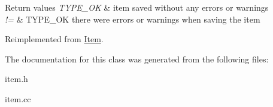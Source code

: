 \begin{DoxyRetVals}{Return values}
{\em T\+Y\+P\+E\+\_\+\+OK} & item saved without any errors or warnings \\
\hline
{\em !=} & T\+Y\+P\+E\+\_\+\+OK there were errors or warnings when saving the item \\
\hline
\end{DoxyRetVals}


Reimplemented from \mbox{\hyperlink{classItem_a463ded5f3c21ed2508dd8fddc6024722}{Item}}.



The documentation for this class was generated from the following files\+:\begin{DoxyCompactItemize}
\item 
item.\+h\item 
item.\+cc\end{DoxyCompactItemize}
